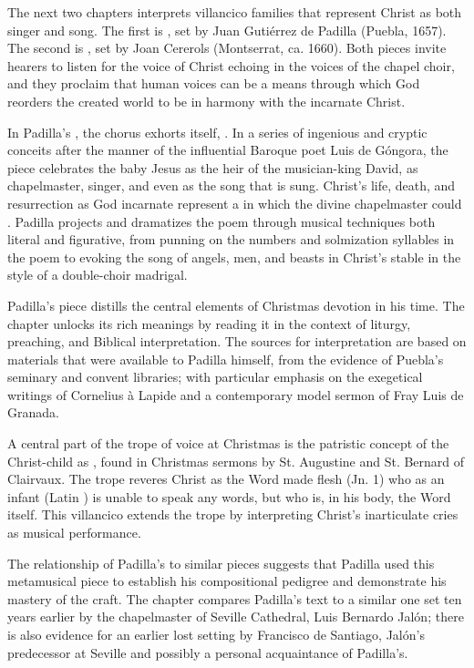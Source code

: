 \documentclass{vcbook-proposal}
\begin{document}
The next two chapters interprets villancico families that represent Christ as
both singer and song.
The first is , set by Juan Gutiérrez de
Padilla (Puebla, 1657).
The second is , set by Joan 
Cererols (Montserrat, ca. 1660).
Both pieces invite hearers to listen for the voice of Christ echoing in the
voices of the chapel choir, and they proclaim that human voices can be a means
through which God reorders the created world to be in harmony with the incarnate
Christ.

In Padilla's , the chorus exhorts itself, .
In a series of ingenious and cryptic conceits after the manner of the
influential Baroque poet Luis de Góngora, the piece celebrates the baby Jesus as
the heir of the musician-king David, as chapelmaster, singer, and even as the
song that is sung.
Christ's life, death, and resurrection as God incarnate represent a 
 in which the divine chapelmaster could .
Padilla projects and dramatizes the poem through musical techniques both literal
and figurative, from punning on the numbers and solmization syllables in the
poem to evoking the song of angels, men, and beasts in Christ's stable in the
style of a double-choir madrigal.

Padilla's piece distills the central elements of Christmas devotion in his time.
The chapter unlocks its rich meanings by reading it in the context of liturgy, 
preaching, and Biblical interpretation.
The sources for interpretation are based on materials that were available to
Padilla himself, from the evidence of Puebla's seminary and convent libraries;
with particular emphasis on the exegetical writings of Cornelius à Lapide and a
contemporary model sermon of Fray Luis de Granada.

A central part of the trope of voice at Christmas is the patristic concept of 
the Christ-child as , found in Christmas sermons by St.
Augustine and St. Bernard of Clairvaux.
The trope reveres Christ as the Word made flesh (Jn. 1) who as an infant (Latin 
) is unable to speak any words, but who is, in his body, the 
Word itself.
This villancico extends the trope by interpreting Christ's inarticulate cries 
as musical performance.

The relationship of Padilla's  to similar 
pieces suggests that Padilla used this metamusical piece to establish his 
compositional pedigree and demonstrate his mastery of the craft.
The chapter compares Padilla's text to a similar one set ten years earlier by
the chapelmaster of Seville Cathedral, Luis Bernardo Jalón; there is also
evidence for an earlier lost setting by Francisco de Santiago, Jalón's
predecessor at Seville and possibly a personal acquaintance of Padilla's.
\end{document}
